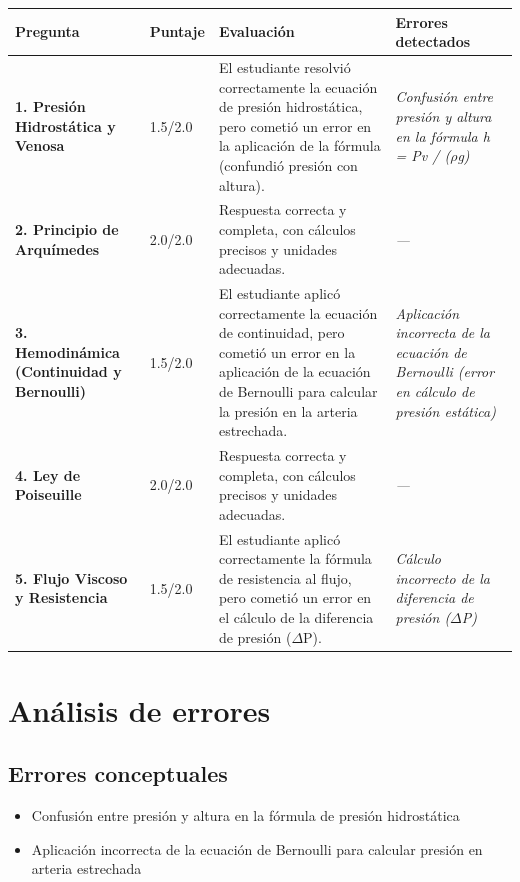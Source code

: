 \documentclass[11pt,a4paper]{article}
\begin{document}
\begin{longtable}{>{\bfseries}p{2.8cm} p{1.6cm} p{7.0cm} p{2.8cm}}
  \toprule
  \textbf{Pregunta} & \textbf{Puntaje} & \textbf{Evaluación} & \textbf{Errores detectados} \\
  \midrule
  \endhead
  \bottomrule
  \endfoot
    \textbf{1. Presión Hidrostática y Venosa} & 1.5/2.0 & El estudiante resolvió correctamente la ecuación de presión hidrostática, pero cometió un error en la aplicación de la fórmula (confundió presión con altura). & \textit{Confusión entre presión y altura en la fórmula h = Pv / ($\rho$g)} \\
    \midrule
    \textbf{2. Principio de Arquímedes} & 2.0/2.0 & Respuesta correcta y completa, con cálculos precisos y unidades adecuadas. & \textit{---} \\
    \midrule
    \textbf{3. Hemodinámica (Continuidad y Bernoulli)} & 1.5/2.0 & El estudiante aplicó correctamente la ecuación de continuidad, pero cometió un error en la aplicación de la ecuación de Bernoulli para calcular la presión en la arteria estrechada. & \textit{Aplicación incorrecta de la ecuación de Bernoulli (error en cálculo de presión estática)} \\
    \midrule
    \textbf{4. Ley de Poiseuille} & 2.0/2.0 & Respuesta correcta y completa, con cálculos precisos y unidades adecuadas. & \textit{---} \\
    \midrule
    \textbf{5. Flujo Viscoso y Resistencia} & 1.5/2.0 & El estudiante aplicó correctamente la fórmula de resistencia al flujo, pero cometió un error en el cálculo de la diferencia de presión ($\Delta$P). & \textit{Cálculo incorrecto de la diferencia de presión ($\Delta$P)} \\
    \midrule
\end{longtable}

\section*{Análisis de errores}

\subsection*{Errores conceptuales}
\begin{itemize}[leftmargin=1.5em, itemsep=2pt]
  \item Confusión entre presión y altura en la fórmula de presión hidrostática
  \item Aplicación incorrecta de la ecuación de Bernoulli para calcular presión en arteria estrechada
\end{itemize}
\end{document}
